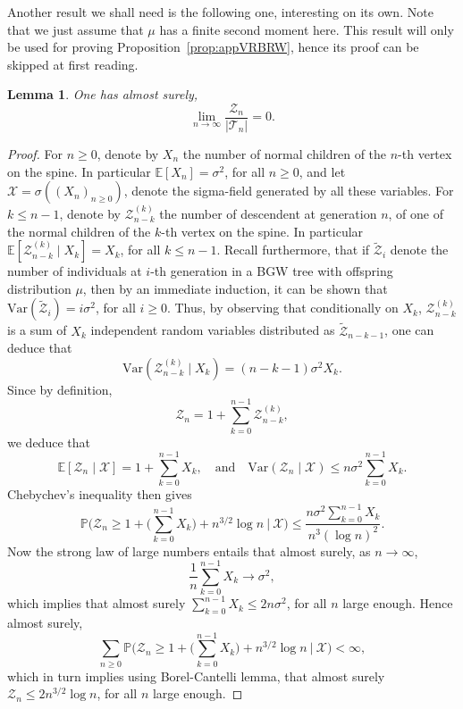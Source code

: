 \documentclass[11pt]{article}
\newtheorem {lem} {Lemma} [section]
\newcommand{\1}{{\text{\Large $\mathfrak 1$}}}
\begin{document}
Another result we shall need is the following one, interesting on its own. Note that we just assume that $\mu$ has a finite second moment here.  
This result will only be used for proving Proposition~\ref{prop:appVRBRW}, hence its proof can be skipped at first reading. 

\begin{lem}\label{lem:ratiolim}
One has almost surely, 
$$\lim_{n\to \infty} \frac{\mathcal Z_n}{|\mathcal T_n|} = 0. $$
\end{lem}
\begin{proof}
For $n\ge 0$, denote by $X_n$ the number of normal children of the $n$-th vertex on the spine. In particular $\mathbb E[X_n] = \sigma^2$, for all $n\ge 0$, and let $\mathcal X = \sigma((X_n)_{n\ge 0})$, denote the sigma-field generated by all these variables. For $k\le n-1$, denote by $\mathcal Z^{(k)}_{n-k}$ the number of 
descendent at generation $n$, of one of the normal children of the $k$-th vertex on the spine. In particular $\mathbb E[\mathcal Z^{(k)}_{n-k} \mid X_k] = X_k$, for all $k\le n-1$. Recall furthermore, that if $\widetilde {\mathcal Z}_i$ denote the number of individuals at $i$-th generation in a BGW tree with offspring distribution $\mu$, then by an immediate induction, it can be shown that $\text{Var}( \widetilde {\mathcal Z}_i) = i\sigma^2$, for all $i\ge 0$. Thus, by observing that conditionally on $X_k$, 
$\mathcal Z^{(k)}_{n-k}$ is a sum of $X_k$ independent random variables distributed as $ \widetilde {\mathcal Z}_{n-k-1}$, one can deduce that
$$\text{Var}(\mathcal Z^{(k)}_{n-k}\mid X_k) = (n-k-1)\sigma^2 X_k.$$
Since by definition, 
$$\mathcal Z_n = 1+ \sum_{k=0}^{n-1} \mathcal Z^{(k)}_{n-k}, $$ 
we deduce that 
$$\mathbb E[\mathcal Z_n\mid \mathcal X] = 1+ \sum_{k=0}^{n-1} X_k, \quad \text{and}\quad \text{Var}(\mathcal Z_n\mid \mathcal X) \le n \sigma^2\sum_{k=0}^{n-1}X_k. $$ 
Chebychev's inequality then gives 
$$\mathbb P\Big(\mathcal Z_n \ge 1+ \big(\sum_{k=0}^{n-1} X_k\big) + n^{3/2} \log n\ \Big|\ \mathcal X \Big)\le \frac{n \sigma^2 \sum_{k=0}^{n-1} X_k}{n^3(\log n)^2}. $$ 
Now the strong law of large numbers entails that almost surely, as $n\to \infty$, 
$$\frac 1n \sum_{k=0}^{n-1} X_k \to \sigma^2,$$
which implies that almost surely $\sum_{k=0}^{n-1} X_k \le 2n\sigma^2$, for all $n$ large enough. 
Hence almost surely, 
$$\sum_{n\ge 0} \mathbb P\Big(\mathcal Z_n \ge 1+ \big(\sum_{k=0}^{n-1} X_k\big) + n^{3/2}\log n\ \Big|\ \mathcal X \Big)<\infty, $$ 
which in turn implies using Borel-Cantelli lemma, that almost surely $\mathcal Z_n \le 2n^{3/2}\log n$, for all $n$ large enough. 



\end{proof}
\end{document}
